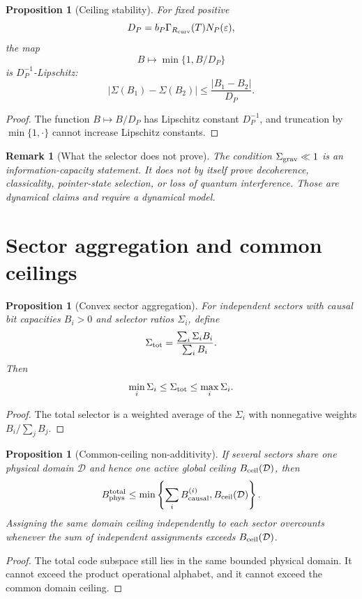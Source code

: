 \documentclass[11pt,a4paper]{article}
\newtheorem{proposition}[theorem]{Proposition}
\newtheorem{remark}[theorem]{Remark}
\begin{document}
\begin{proposition}[Ceiling stability]
For fixed positive
\[
D_P=b_P\Gamma_{R_{\rm curv}}(T)N_P(\varepsilon),
\]
the map
\[
B\mapsto \min\{1,B/D_P\}
\]
is $D_P^{-1}$-Lipschitz:
\[
|\Sigma(B_1)-\Sigma(B_2)|
\le
\frac{|B_1-B_2|}{D_P}.
\]
\end{proposition}
\begin{proof}
The function $B\mapsto B/D_P$ has Lipschitz constant $D_P^{-1}$, and truncation by $\min\{1,\cdot\}$ cannot increase Lipschitz constants.
\end{proof}

\begin{remark}[What the selector does not prove]
The condition $\Sigma_{\rm grav}\ll1$ is an information-capacity statement.  It does not by itself prove decoherence, classicality, pointer-state selection, or loss of quantum interference.  Those are dynamical claims and require a dynamical model.
\end{remark}



\section{Sector aggregation and common ceilings}

\begin{proposition}[Convex sector aggregation]
For independent sectors with causal bit capacities $B_i>0$ and selector ratios $\Sigma_i$, define
\[
\Sigma_{\rm tot}=\frac{\sum_i\Sigma_iB_i}{\sum_iB_i}.
\]
Then
\[
\min_i\Sigma_i\le\Sigma_{\rm tot}\le\max_i\Sigma_i.
\]
\end{proposition}
\begin{proof}
The total selector is a weighted average of the $\Sigma_i$ with nonnegative weights $B_i/\sum_jB_j$.
\end{proof}

\begin{proposition}[Common-ceiling non-additivity]
If several sectors share one physical domain $\mathcal D$ and hence one active global ceiling $B_{\rm ceil}(\mathcal D)$, then
\[
B_{\rm phys}^{\rm total}
\le
\min\left\{\sum_iB_{\rm causal}^{(i)},B_{\rm ceil}(\mathcal D)\right\}.
\]
Assigning the same domain ceiling independently to each sector overcounts whenever the sum of independent assignments exceeds $B_{\rm ceil}(\mathcal D)$.
\end{proposition}
\begin{proof}
The total code subspace still lies in the same bounded physical domain.  It cannot exceed the product operational alphabet, and it cannot exceed the common domain ceiling.
\end{proof}
\end{document}
